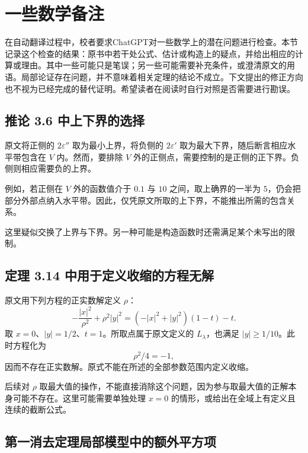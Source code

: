 

\clearpage
\chapter*{一些数学备注}

在自动翻译过程中，校者要求ChatGPT对一些数学上的潜在问题进行检查。本节记录这个检查的结果：原书中若干处公式、估计或构造上的疑点，并给出相应的计算或理由。其中一些可能只是笔误；另一些可能需要补充条件，或澄清原文的用语。局部论证存在问题，并不意味着相关定理的结论不成立。下文提出的修正方向也不视为已经完成的替代证明。希望读者在阅读时自行对照是否需要进行勘误。


\section*{推论 3.6 中上下界的选择}

原文将正侧的 $2\varepsilon''$ 取为最小上界，将负侧的 $2\varepsilon'$ 取为最大下界，随后断言相应水平带包含在 $V$ 内。然而，要排除 $V$ 外的正侧点，需要控制的是正侧的正下界。负侧则相应需要负的上界。

例如，若正侧在 $V$ 外的函数值介于 $0.1$ 与 $10$ 之间，取上确界的一半为 $5$，仍会把部分外部点纳入水平带。因此，仅凭原文所取的上下界，不能推出所需的包含关系。

这里疑似交换了上界与下界。另一种可能是构造函数时还需满足某个未写出的限制。

\section*{定理 3.14 中用于定义收缩的方程无解}

原文用下列方程的正实数解定义 $\rho$：
\[
-\frac{|x|^2}{\rho^2}+\rho^2|y|^2
=(-|x|^2+|y|^2)(1-t)-t.
\]
取 $x=0$、$|y|=1/2$、$t=1$。所取点属于原文定义的 $L_\lambda$，也满足 $|y|\geq1/10$。此时方程化为
\[
\rho^2/4=-1,
\]
因而不存在正实数解。原式不能在所述的全部参数范围内定义收缩。

后续对 $\rho$ 取最大值的操作，不能直接消除这个问题，因为参与取最大值的正解本身可能不存在。这里可能需要单独处理 $x=0$ 的情形，或给出在全域上有定义且连续的截断公式。


\section*{第一消去定理局部模型中的额外平方项}

